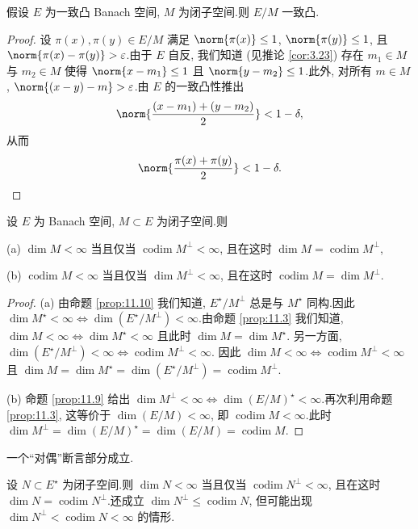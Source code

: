 \begin{proposition}
\label{prop:11.12}
假设 $E$ 为一致凸 Banach 空间, $M$ 为闭子空间.则 $E/M$ 一致凸.
\end{proposition}

\begin{proof}
设 $\pi(x),\pi(y)\in E/M$ 满足 $\norm{\pi(x)}\le1$, $\norm{\pi(y)}\le1$,
且 $\norm{\pi(x)-\pi(y)}>\varepsilon$.由于 $E$ 自反, 我们知道 (见推论
 \ref{cor:3.23}) 存在 $m_1\in M$ 与 $m_2\in M$ 使得
$\norm{x-m_1}\le1$ 且 $\norm{y-m_2}\le1$.此外, 对所有 $m\in M$,
$\norm{(x-y)-m}>\varepsilon$.由 $E$ 的一致凸性推出
\begin{equation*}
\norm{\frac{(x-m_1)+(y-m_2)}{2}}<1-\delta,
\end{equation*}
从而
\begin{equation*}
\norm{\frac{\pi(x)+\pi(y)}{2}}<1-\delta.
\end{equation*}
\end{proof}

\begin{proposition}
\label{prop:11.13}
设 $E$ 为 Banach 空间, $M\subset E$ 为闭子空间.则

(a) $\dim M<\infty$ 当且仅当 $\operatorname{codim}M^\perp<\infty$, 且在这时
$\dim M=\operatorname{codim}M^\perp$,

(b) $\operatorname{codim}M<\infty$ 当且仅当 $\dim M^\perp<\infty$, 且在这时
$\operatorname{codim}M=\dim M^\perp$.
\end{proposition}

\begin{proof}
(a) 由命题  \ref{prop:11.10} 我们知道, $E^\star/M^\perp$ 总是与 $M^\star$
同构.因此
$\dim M^\star<\infty\iff\dim(E^\star/M^\perp)<\infty$.由命题
 \ref{prop:11.3} 我们知道,
$\dim M<\infty\iff\dim M^\star<\infty$ 且此时 $\dim M=\dim M^\star$.
另一方面,
$\dim(E^\star/M^\perp)<\infty\iff\operatorname{codim}M^\perp<\infty$.
因此 $\dim M<\infty\iff\operatorname{codim}M^\perp<\infty$ 且
$\dim M=\dim M^\star=\dim(E^\star/M^\perp)=\operatorname{codim}M^\perp$.

(b) 命题  \ref{prop:11.9} 给出
$\dim M^\perp<\infty\iff\dim(E/M)^\star<\infty$.再次利用命题
 \ref{prop:11.3}, 这等价于 $\dim(E/M)<\infty$, 即
$\operatorname{codim}M<\infty$.此时
$\dim M^\perp=\dim(E/M)^\star=\dim(E/M)=\operatorname{codim}M$.
\end{proof}

一个``对偶''断言部分成立.

\begin{proposition}
\label{prop:11.14}
设 $N\subset E^\star$ 为闭子空间.则 $\dim N<\infty$ 当且仅当
$\operatorname{codim}N^\perp<\infty$, 且在这时
$\dim N=\operatorname{codim}N^\perp$.还成立
$\dim N^\perp\le\operatorname{codim}N$, 但可能出现
$\dim N^\perp<\operatorname{codim}N<\infty$ 的情形.
\end{proposition}

